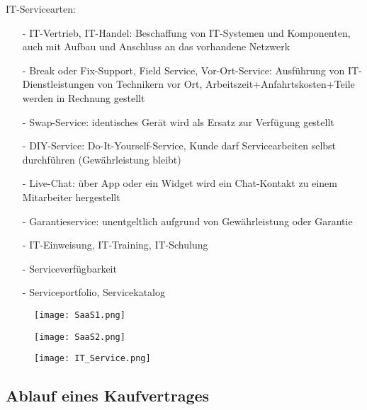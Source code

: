 \documentclass[asp1.tex]{subfiles}
\begin{document}
IT-Servicearten:
\begin{itemize}
    \item[-]IT-Vertrieb, IT-Handel: Beschaffung von IT-Systemen und Komponenten, auch mit Aufbau und Anschluss an das vorhandene Netzwerk
    \item[-]Break oder Fix-Support, Field Service, Vor-Ort-Service: Ausführung von IT-Dienstleistungen von Technikern vor Ort, Arbeitszeit+Anfahrtskosten+Teile werden in Rechnung gestellt
    \item[-]Swap-Service: identisches Gerät wird als Ersatz zur Verfügung gestellt
    \item[-]DIY-Service: Do-It-Yourself-Service, Kunde darf Servicearbeiten selbst durchführen (Gewährleistung bleibt)
    \item[-]Live-Chat: über App oder ein Widget wird ein Chat-Kontakt zu einem Mitarbeiter hergestellt
    \item[-]Garantieservice: unentgeltlich aufgrund von Gewährleistung oder Garantie
    \item[-]IT-Einweisung, IT-Training, IT-Schulung
    \item[-]Serviceverfügbarkeit
    \item[-]Serviceportfolio, Servicekatalog
\end{itemize}


\begin{figure}[H]
    \begin{center}
        \texttt{[image: SaaS1.png]}
    \end{center}
    \label{fig:saas1.png}
\end{figure}

\begin{figure}[H]
    \begin{center}
        \texttt{[image: SaaS2.png]}
    \end{center}
    \label{fig:saas2.png}
\end{figure}

\begin{figure}[H]
    \begin{center}
        \texttt{[image: IT\_Service.png]}
    \end{center}

    \label{fig:IT_Service.png}
\end{figure}

\subsection{Ablauf eines Kaufvertrages}
\end{document}

